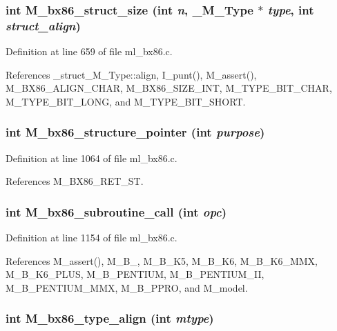 \subsubsection{\setlength{\rightskip}{0pt plus 5cm}int M\_\-bx86\_\-struct\_\-size (int {\em n}, \bf{\_\-M\_\-Type} $\ast$ {\em type}, int {\em struct\_\-align})}\label{m__bx86_8h_178ec470e25149e4860c12c0f7f02b52}




Definition at line 659 of file ml\_\-bx86.c.

References \_\-struct\_\-M\_\-Type::align, I\_\-punt(), M\_\-assert(), M\_\-BX86\_\-ALIGN\_\-CHAR, M\_\-BX86\_\-SIZE\_\-INT, M\_\-TYPE\_\-BIT\_\-CHAR, M\_\-TYPE\_\-BIT\_\-LONG, and M\_\-TYPE\_\-BIT\_\-SHORT.
\subsubsection{\setlength{\rightskip}{0pt plus 5cm}int M\_\-bx86\_\-structure\_\-pointer (int {\em purpose})}\label{m__bx86_8h_1143f1cb9d965e619b8efb827b0ac9f7}




Definition at line 1064 of file ml\_\-bx86.c.

References M\_\-BX86\_\-RET\_\-ST.
\subsubsection{\setlength{\rightskip}{0pt plus 5cm}int M\_\-bx86\_\-subroutine\_\-call (int {\em opc})}\label{m__bx86_8h_ed0763221ce8b928fded67eb4bbe86ac}




Definition at line 1154 of file ml\_\-bx86.c.

References M\_\-assert(), M\_\-B\_, M\_\-B\_\-K5, M\_\-B\_\-K6, M\_\-B\_\-K6\_\-MMX, M\_\-B\_\-K6\_\-PLUS, M\_\-B\_\-PENTIUM, M\_\-B\_\-PENTIUM\_\-II, M\_\-B\_\-PENTIUM\_\-MMX, M\_\-B\_\-PPRO, and M\_\-model.
\subsubsection{\setlength{\rightskip}{0pt plus 5cm}int M\_\-bx86\_\-type\_\-align (int {\em mtype})}\label{m__bx86_8h_1332b69cea771071165132f5da62fd02}




